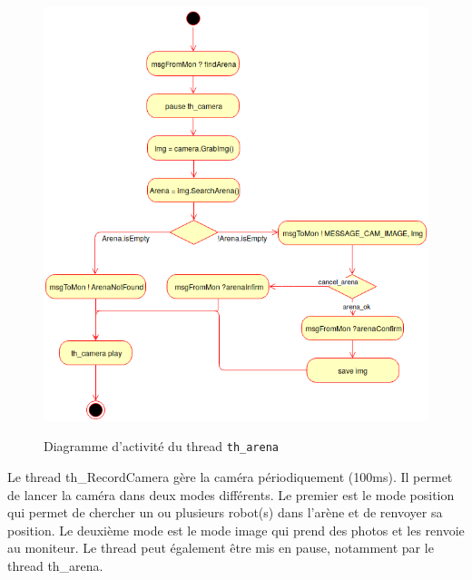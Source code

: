\documentclass[11pt, a4paper]{paper}
\begin{document}
\begin{figure}[htbp]
\label{fig:act_envoyer}
\begin{center}
{\includegraphics[scale=.3]{./dossier_conception/th_arena}}
{\caption{Diagramme d'activité du thread {\tt th\_arena}}}
\end{center}
\end{figure}
\FloatBarrier

{Le thread th\_RecordCamera gère la caméra périodiquement (100ms). Il permet de lancer la caméra dans deux modes différents. Le premier est le mode position qui permet de chercher un ou plusieurs robot(s) dans l'arène et de renvoyer sa position. Le deuxième mode est le mode image qui prend des photos et les renvoie au moniteur. Le thread peut également être mis en pause, notamment par le thread th\_arena.}
\end{document}
